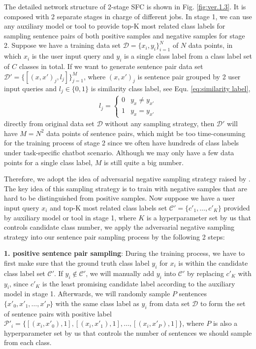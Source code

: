 \documentclass[letterpaper]{article} %
\begin{document}
  The   detailed   network   structure   of   2-stage   SFC  is  shown  in  Fig.
  \ref{fig:ver.1.3}.  It  is  composed  with  2  separate  stages  in  charge of
  different  jobs. In stage 1, we can use any auxiliary model or tool to provide
  top-K  most  related class labels for sampling sentence pairs of both positive
  samples  and negative samples for stage 2. Suppose we have a training data set
  $\mathcal{D}=\{x_{i},y_{i}\}_{i=1}^{N}$  of  $N$ data points, in which $x_{i}$
  is the user input query and $y_{i}$ is a single class label from a class label
  set  of  $C$  classes  in total. If we want to generate sentence pair data set
  $\mathcal{D'}=\{[(x,x')_{j},l_{j}]\}_{j=1}^{M}$,   where   $(x,   x')_{j}$  is
  sentence  pair  grouped  by  2  user  input  queries and $l_{j}\in\{0, 1\}$ is
  similarity class label, see Equ. \ref{eq:similarity label},
  \begin{align}
    l_{j}=
    \begin{cases} \label{eq:similarity label}
      0 & y_{x}\neq y_{x'}\\
      1 & y_{x}=y_{x'}
    \end{cases}
  \end{align}
  directly  from  original data set $\mathcal{D}$ without any sampling strategy,
  then  $\mathcal{D'}$  will  have  $M=N^2$ data points of sentence pairs, which
  might be too time-consuming for the training process of stage 2 since we often
  have  hundreds  of class labels under task-specific chatbot scenario. Although
  we  may  only  have  a  few data points for a single class label, $M$ is still
  quite a big number.

  Therefore,  we adopt the idea of adversarial negative sampling strategy raised
  by   \cite{bamler2020extreme}.  The  key  idea  of this sampling strategy is to
  train  with  negative  samples that are hard to be distinguished from positive
  samples. Now suppose we have a user input query $x_{i}$ and top-K most related
  class   labels   set  $\mathcal{C'}=\{c'_{1},  \dots,  c'_{K}\}$  provided  by
  auxiliary  model  or  tool in stage 1, where $K$ is a hyperparameter set by us
  that  controls  candidate  class  number,  we  apply  the adversarial negative
  sampling  strategy  into our sentence pair sampling process by the following 2
  steps:

  \textbf{1.  positive  sentence pair sampling}: During the training process, we
  have  to first make sure that the ground truth class label $y_{i}$ for $x_{i}$
  is  within  the  candidate  class  label  set  $\mathcal{C'}$. If $y_{i}\notin
  \mathcal{C'}$,  we  will manually add $y_{i}$ into $\mathcal{C'}$ by replacing
  $c'_{K}$  with  $y_{i}$, since $c'_{K}$ is the least promising candidate label
  according  to  the  auxiliary  model  in stage 1. Afterwards, we will randomly
  sample  $P$  sentences  $\{x'_{0},x'_{1}, \dots, x'_{P}\}$ with the same class
  label as $y_{i}$ from data set $\mathcal{D}$ to form the set of sentence pairs
  with   positive   label  $\mathcal{P'}_{i}=\{[(x_{i},  x'_{0}),  1],  [(x_{i},
  x'_{1}),   1],   \dots,   [(x_{i},   x'_{P}),  1]\}$,  where  $P$  is  also  a
  hyperparameter  set  by  us  that  controls  the number of sentences we should
  sample from each class.
\end{document}
